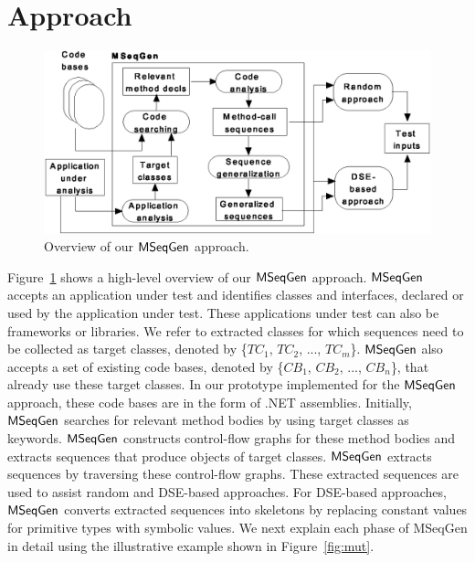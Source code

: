\documentclass{sig-alternate}
\begin{document}
\section{Approach}
\label{sec:approach}

\begin{figure}[t]
\centering
\includegraphics[scale=0.75,clip]{figs/architecture1.eps}\vspace*{-1ex}
\caption{Overview of our $\textsf{MSeqGen} $ approach.} \label{fig:architecture}
\vspace*{-3ex}
\end{figure}

Figure~\ref{fig:architecture} shows a high-level overview of our $\textsf{MSeqGen} $ approach. $\textsf{MSeqGen} $ accepts an application under test and identifies classes and interfaces, declared or used by the application under test. These applications under test can also be frameworks or libraries. We refer to extracted classes for which sequences need to be collected as target classes, denoted by \{$TC_1$, $TC_2$, ..., $TC_m$\}. $\textsf{MSeqGen} $ also accepts a set of existing code bases, denoted by \{$CB_1$, $CB_2$, ..., $CB_n$\}, that already use these target classes. In our prototype implemented for the $\textsf{MSeqGen} $ approach, these code bases are in the form of .NET assemblies. Initially, $\textsf{MSeqGen} $ searches for relevant method bodies by using target classes as keywords. $\textsf{MSeqGen} $ constructs control-flow graphs for these method bodies and extracts sequences that produce objects of target classes. $\textsf{MSeqGen} $ extracts sequences by traversing these control-flow graphs. These extracted  sequences are used to assist random and DSE-based approaches. For DSE-based approaches, $\textsf{MSeqGen} $ converts extracted sequences into skeletons by replacing constant values for primitive types with symbolic values. We next explain each phase of MSeqGen in detail using the illustrative example shown in Figure~\ref{fig:mut}.
\end{document}
